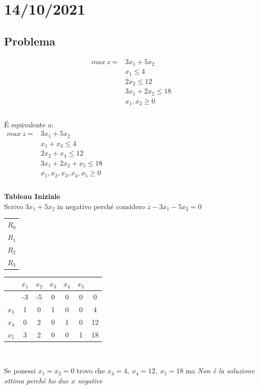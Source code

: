 \documentclass[12pt,a4paper]{article}
\begin{document}
 \clearpage
 \section{14/10/2021}
 \subsection{Problema}
  $$\begin{array}{cl}
max \ z = & 3x_1+5x_2\\
 & x_1\leq 4\\
 & 2x_2 \leq 12\\
 & 3x_1+2x_2 \leq 18\\
 & x_1,x_2 \geq 0\\
 \end{array}$$\\
 \'E equivalente  a: \\
$\begin{array}{cl}
max \ z = & 3x_1+5x_2\\
 & x_1+ x_3\leq 4\\
 & 2x_2 + x_4\leq 12\\
 & 3x_1+2x_2 + x_5 \leq 18\\
 & x_1,x_2,x_3,x_4,x_5 \geq 0\\
\end{array}$\\
\\
\textbf{Tableau Iniziale}\\
Scrivo $3x_1+5x_2$ in negativo perché considero $z-3x_1-5x_2=0$\\
\begin{center}
\begin{tabular}{c}
\\
$R_0$\\
$R_1$\\
$R_2$\\
$R_3$\\
\end{tabular}
\begin{tabular}{r|ccccc|c|}
& $x_1$ & $x_2$ & $x_3$ & $x_4$ & $x_5$\\
 \hline
 & -3 & -5 & 0 & 0 & 0 & 0\\
$x_3$ & 1 & 0 & 1 & 0 & 0 & 4\\
$x_4$ & 0 & 2 & 0 & 1 & 0 & 12\\
$x_5$ & 3 & 2 & 0 & 0 & 1 & 18\\
\end{tabular}\\
\end{center}
Se ponessi $x_1=x_2=0$ trovo che $x_3 =4, \ x_4=12, \ x_5 = 18$ ma \textsl{Non è la soluzione ottima perché ho due $x$ negative}\\
\end{document}
